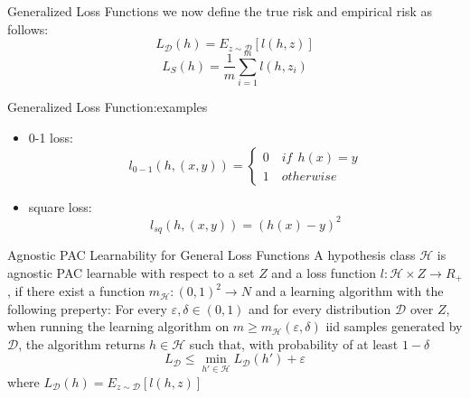 \documentclass{beamer}
\begin{document}
\begin{frame}{Generalized Loss Functions}
	we now define the true risk and empirical risk as follows:
	\[L_{\mathcal{D}} (h) = E_{z \sim \mathcal{D}}[l(h,z)]\]
	\[L_S (h) = \frac{1}{m} \sum^m_{i=1} l(h,z_i)\]
\end{frame}
\begin{frame}{Generalized Loss Function:examples}
	\begin{itemize}
			\item 0-1 loss:
				\[l_{0-1} (h,(x,y)) = \begin{cases}
						0 \quad if \ \ h(x) = y	 \\
						1 \quad otherwise
				\end{cases}\]
			\item square loss:
				\[l_{sq} (h,(x,y)) = (h(x) - y)^2\]
	\end{itemize}
\end{frame}
\begin{frame}{Agnostic PAC Learnability for General Loss Functions}
	A hypothesis class $\mathcal{H}$ is agnostic PAC learnable with respect to a set $Z$ and a loss function $l: \mathcal{H} \times Z \rightarrow R_+$, if there exist a function $m_{\mathcal{H}}:(0,1)^2 \rightarrow N$ and a learning algorithm with the following preperty: For every $\varepsilon,\delta \in (0,1)$ and for every distribution $\mathcal{D}$ over $Z$, when running the learning algorithm on $m \geq m_{\mathcal{H}} (\varepsilon,\delta)$ iid samples generated by $\mathcal{D}$, the algorithm returns $h \in \mathcal{H}$ such that, with probability of at least $1- \delta$
	\[L_{\mathcal{D}} \leq \min_{h' \in \mathcal{H}} L_{\mathcal{D}} (h') + \varepsilon\]
	where $L_{\mathcal{D}}(h) = E_{z \sim \mathcal{D}} [l(h,z)]$
\end{frame}
\end{document}
